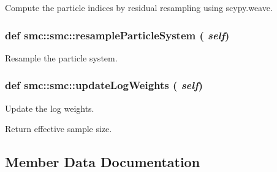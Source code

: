 Compute the particle indices by residual resampling using scypy.weave. 

\hypertarget{classsmc_1_1smc_7c417c930e9039fd1bbda56d40ceb38d}{
\subsubsection[{resampleParticleSystem}]{\setlength{\rightskip}{0pt plus 5cm}def smc::smc::resampleParticleSystem ( {\em self})}}
\label{classsmc_1_1smc_7c417c930e9039fd1bbda56d40ceb38d}


Resample the particle system. 

\hypertarget{classsmc_1_1smc_698a2598642ff7f48f0b6ab87b0e81cc}{
\subsubsection[{updateLogWeights}]{\setlength{\rightskip}{0pt plus 5cm}def smc::smc::updateLogWeights ( {\em self})}}
\label{classsmc_1_1smc_698a2598642ff7f48f0b6ab87b0e81cc}


Update the log weights. 

Return effective sample size. 

\subsection{Member Data Documentation}
\hypertarget{classsmc_1_1smc_927a6dd0b643bac0c5cadf396389b44d}{
\subsubsection[{changeProposalDistr}]{}}
\label{classsmc_1_1smc_927a6dd0b643bac0c5cadf396389b44d}


\hypertarget{classsmc_1_1smc_c63ef54a10ca8d071ccb44851861074d}{
\subsubsection[{kappa}]{}}
\label{classsmc_1_1smc_c63ef54a10ca8d071ccb44851861074d}


